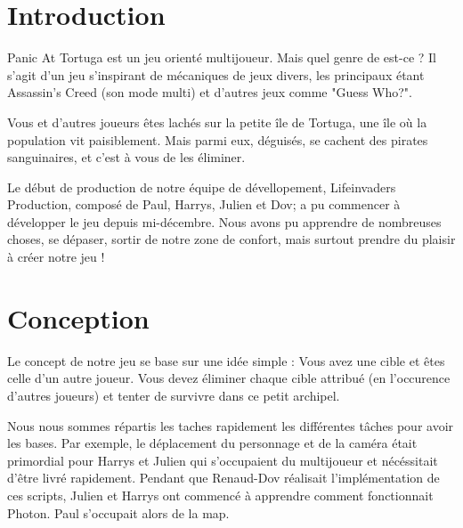 \documentclass[french, 12pt]{article}
\begin{document}


\tableofcontents
\newpage

\pagestyle{fancy}

\section{Introduction}

Panic At Tortuga est un jeu orienté multijoueur. Mais quel genre de est-ce ?
Il s'agit d'un jeu s'inspirant de mécaniques de jeux divers, 
les principaux étant Assassin's Creed (son mode multi) et d'autres jeux comme "Guess Who?".

Vous et d'autres joueurs êtes lachés sur la petite île de Tortuga, une île où la population vit paisiblement.
Mais parmi eux, déguisés, se cachent des pirates sanguinaires, et c'est à vous de les éliminer.

Le début de production de notre équipe de dévellopement, Lifeinvaders Production,
composé de Paul, Harrys, Julien et Dov; a pu commencer à développer le jeu depuis mi-décembre.
Nous avons pu apprendre de nombreuses choses, se dépaser, sortir de notre zone de confort, mais surtout prendre du plaisir à créer notre jeu !


\section{Conception}

    Le concept de notre jeu se base sur une idée simple : Vous avez une cible et êtes celle d'un autre joueur.
    Vous devez éliminer chaque cible attribué (en l'occurence d'autres joueurs) et tenter de survivre dans ce petit archipel.

    Nous nous sommes répartis les taches rapidement les différentes tâches pour avoir les bases.
    Par exemple, le déplacement du personnage et de la caméra était primordial pour Harrys et Julien qui s'occupaient du multijoueur et nécéssitait d'être livré rapidement.
    Pendant que Renaud-Dov réalisait l'implémentation de ces scripts, Julien et Harrys ont commencé à apprendre comment fonctionnait Photon. Paul s'occupait alors de la map.
\end{document}
